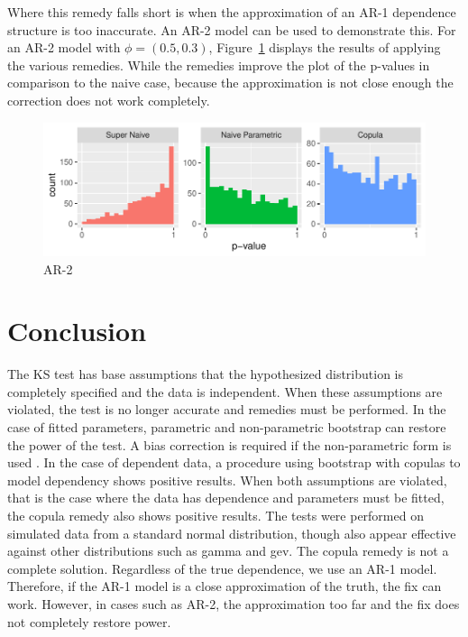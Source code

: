 \documentclass[12pt, letterpaper, titlepage]{article}
\begin{document}
Where this remedy falls short is when the approximation of an AR-1 dependence 
structure is too inaccurate. An AR-2 model can be used to demonstrate this. For 
an AR-2 model with $\phi = (0.5, 0.3)$, Figure~\ref{fig:hist_ar2_FD} 
displays the results of applying the various remedies. While the remedies 
improve the plot of the p-values in comparison to the naive case, because the 
approximation is not close enough the correction does not work completely.

\begin{figure}[tbp]
  \centering
  \includegraphics{hist_ar2_FD}
  \caption{AR-2}
  \label{fig:hist_ar2_FD}
\end{figure}


\section{Conclusion}\label{sec:conclusion}

The KS test has base assumptions that the hypothesized distribution is 
completely specified and the data is independent. When these assumptions are 
violated, the test is no longer accurate and remedies must be performed. In the 
case of fitted parameters, parametric and non-parametric bootstrap can restore 
the power of the test. A bias correction is required if the non-parametric form 
is used \citep{Babu}. In the case of dependent data, a procedure using bootstrap 
with copulas to model dependency shows positive results. When both assumptions 
are violated, that is the case where the data has dependence and parameters must 
be fitted, the copula remedy also shows positive results. The tests were 
performed on simulated data from a standard normal distribution, though also 
appear effective against other distributions such as gamma and gev. The copula 
remedy is not a complete solution. Regardless of the true dependence, we use an 
AR-1 model. Therefore, if the AR-1 model is a close approximation of the truth, 
the fix can work. However, in cases such as AR-2, the approximation too far and 
the fix does not completely restore power.




\end{document}

